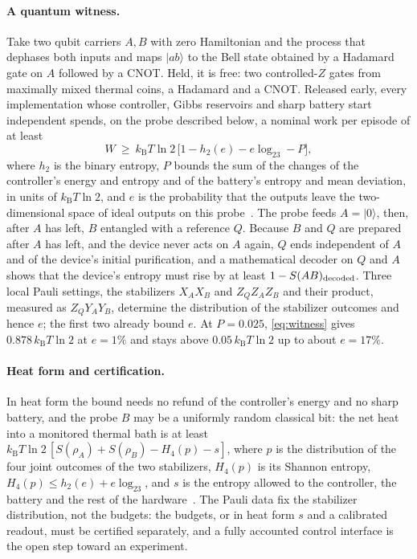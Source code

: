 \documentclass[11pt]{article}
\newcommand{\kB}{k_{\mathrm B}}
\begin{document}
\paragraph{A quantum witness.} Take two qubit carriers $A,B$ with zero Hamiltonian and the process that dephases both inputs and maps $|ab\rangle$ to the Bell state obtained by a Hadamard gate on $A$ followed by a CNOT. Held, it is free: two controlled-$Z$ gates from maximally mixed thermal coins, a Hadamard and a CNOT. Released early, every implementation whose controller, Gibbs reservoirs and sharp battery start independent spends, on the probe described below, a nominal work per episode of at least
\begin{equation}\label{eq:witness}
W\ \ge\ \kB T\ln2\,\bigl[1-h_2(e)-e\log_23-P\bigr],
\end{equation}
where $h_2$ is the binary entropy, $P$ bounds the sum of the changes of the controller's energy and entropy and of the battery's entropy and mean deviation, in units of $\kB T\ln2$, and $e$ is the probability that the outputs leave the two-dimensional space of ideal outputs on this probe~\cite[Prop.~6]{Order}. The probe feeds $A=|0\rangle$, then, after $A$ has left, $B$ entangled with a reference $Q$. Because $B$ and $Q$ are prepared after $A$ has left, and the device never acts on $A$ again, $Q$ ends independent of $A$ and of the device's initial purification, and a mathematical decoder on $Q$ and $A$ shows that the device's entropy must rise by at least $1-S(AB)_{\rm decoded}$. Three local Pauli settings, the stabilizers $X_AX_B$ and $Z_QZ_AZ_B$ and their product, measured as $Z_QY_AY_B$, determine the distribution of the stabilizer outcomes and hence $e$; the first two already bound $e$. At $P=0.025$, \eqref{eq:witness} gives $0.878\,\kB T\ln2$ at $e=1\%$ and stays above $0.05\,\kB T\ln2$ up to about $e=17\%$.

\paragraph{Heat form and certification.} In heat form the bound needs no refund of the controller's energy and no sharp battery, and the probe $B$ may be a uniformly random classical bit: the net heat into a monitored thermal bath is at least $\kB T\ln2\,[S(\rho_A)+S(\rho_B)-H_4(p)-s]$, where $p$ is the distribution of the four joint outcomes of the two stabilizers, $H_4(p)$ is its Shannon entropy, $H_4(p)\le h_2(e)+e\log_23$, and $s$ is the entropy allowed to the controller, the battery and the rest of the hardware~\cite[Prop.~6]{Order}. The Pauli data fix the stabilizer distribution, not the budgets: the budgets, or in heat form $s$ and a calibrated readout, must be certified separately, and a fully accounted control interface is the open step toward an experiment.
\end{document}
